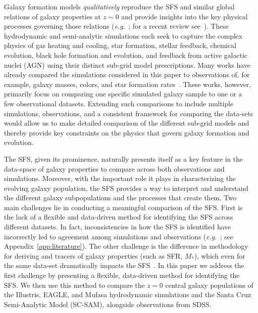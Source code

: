 \documentclass[tighten, preprint]{aastex62}
\begin{document}
Galaxy formation models \emph{qualitatively} reproduce the SFS and 
similar global relations of galaxy properties at $z\sim0$ 
and provide insights into the key physical processes governing those relations 
(\emph{e.g.}~\citealt{vogelsberger2014,genel2014, schaye2015, somerville2015a, dave2017}; 
for a recent review see~\citealt{somerville2015}). These hydrodynamic and 
semi-analytic simulations each seek to capture the complex physics of 
gas heating and cooling, star formation, stellar feedback, chemical 
evolution, black hole formation and evolution, and feedback from active 
galactic nuclei (AGN) using their distinct sub-grid model prescriptions.
Many works have already compared the simulations considered in this paper to 
observations of, for example, galaxy masses, colors, and star formation 
rates~\citep[\emph{e.g.}][]{vogelsberger2014, genel2014, torrey2014, sparre2015, schaye2015, bluck2016, dave2017, somerville2015}. 
These works, however, primarily focus on comparing one specific simulated 
galaxy sample to one or a few observational datasets. Extending such 
comparisons to include multiple simulations, observations, and a 
consistent framework for comparing the data-sets would allow us to make 
detailed comparison of the different sub-grid models and thereby provide 
key constraints on the physics that govern galaxy formation and evolution.  

The SFS, given its prominence, naturally presents itself as a key feature 
in the data-space of galaxy properties to compare across both observations 
and simulations. Moreover, with the important role it plays in characterizing 
the evolving galaxy population, the SFS provides a way to interpret and 
understand the different galaxy subpopulations and the processes that create them.
Two main challenges lie in conducting a meaningful comparison of the SFS. First 
is the lack of a flexible and data-driven method for identifying the SFS across 
different datasets. In fact, inconsistencies in how the SFS is identified 
have incorrectly led to agreement among simulations and 
observations (\emph{e.g.}~\citealt{somerville2015}; 
see Appendix~\ref{app:literature}). %
The other challenge is the difference in methodology for deriving and 
tracers of galaxy properties (such as SFR, $M_*$), which even for the same 
data-set dramatically impacts the SFS~\citep[\emph{e.g.}][]{speagle2014}. 
In this paper we address the first challenge by presenting a flexible, 
data-driven method for identifying the SFS. We then use this method to compare 
the $z = 0$ central galaxy populations of the Illustris, EAGLE, and {\sc Mufasa} 
hydrodynamic simulations and the Santa Cruz Semi-Analytic Model (SC-SAM), alongside 
observations from SDSS. 
\end{document}
